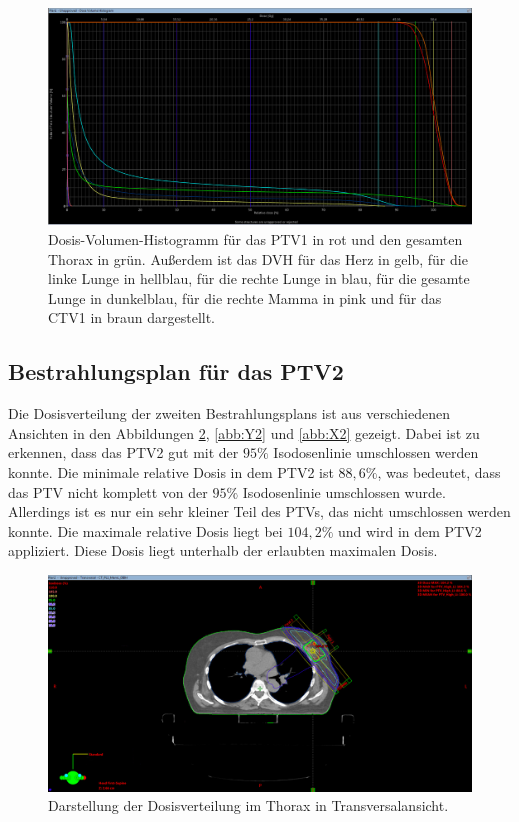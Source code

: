 \begin{figure}[H]
  \centering
  \includegraphics[width=\textwidth]{Bilder/DVH1.png}
  \caption{Dosis-Volumen-Histogramm für das PTV1 in rot und den gesamten Thorax in grün. Außerdem ist das DVH für das Herz in gelb, für die linke Lunge in hellblau, für die rechte Lunge in blau, für die gesamte Lunge in dunkelblau, für die rechte Mamma in pink und für das CTV1 in braun dargestellt.}
  \label{abb:DVH}
\end{figure}

\subsection*{Bestrahlungsplan für das PTV2}

Die Dosisverteilung der zweiten Bestrahlungsplans ist aus verschiedenen Ansichten in
den Abbildungen \ref{abb:Z2}, \ref{abb:Y2} und \ref{abb:X2} gezeigt. Dabei ist zu erkennen,
dass das PTV2 gut mit der $95\%$ Isodosenlinie umschlossen werden konnte. Die
minimale relative Dosis in dem PTV2 ist $88,6\%$, was bedeutet, dass das PTV nicht komplett von
der $95\%$ Isodosenlinie umschlossen wurde. Allerdings ist es nur ein sehr kleiner
Teil des PTVs, das nicht umschlossen werden konnte. Die maximale relative Dosis liegt bei
$104,2\%$ und wird in dem PTV2 appliziert. Diese Dosis liegt unterhalb der erlaubten maximalen
Dosis.

\begin{figure}[H]
  \centering
  \includegraphics[width=\textwidth]{Bilder/Mamma2_Z.png}
  \caption{Darstellung der Dosisverteilung im Thorax in Transversalansicht.}
  \label{abb:Z2}
\end{figure}

